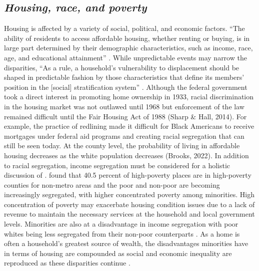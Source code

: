 \subsection{\textit{Housing, race, and poverty}}
Housing is affected by a variety of social, political, and economic factors. “The ability of residents to access affordable housing, whether renting or buying, is in large part determined by their demographic characteristics, such as income, race, age, and educational attainment” \citep[115]{yadavalli_comprehensive_2020}. While unpredictable events may narrow the disparities, “As a rule, a household’s vulnerability to displacement should be shaped in predictable fashion by those characteristics that define its members’ position in the [social] stratification system” \citep[5]{lee_forced_2020}. Although the federal government took a direct interest in promoting home ownership in 1933, racial discrimination in the housing market was not outlawed until 1968 but enforcement of the law remained difficult until the Fair Housing Act of 1988 (Sharp \& Hall, 2014). For example, the practice of redlining made it difficult for Black Americans to receive mortgages under federal aid programs and creating racial segregation that can still be seen today. At the county level, the probability of living in affordable housing decreases as the white population decreases (Brooks, 2022). In addition to racial segregation, income segregation must be considered for a holistic discussion of \hs. \citet{lichter_rural_2011} found that 40.5 percent of high-poverty places are in high-poverty counties for non-metro areas and the poor and non-poor are becoming increasingly segregated, with higher concentrated poverty among minorities. High concentration of poverty may exacerbate housing condition issues due to a lack of revenue to maintain the necessary services at the household and local government levels. Minorities are also at a disadvantage in income segregation with poor whites being less segregated from their non-poor counterparts \citep{lichter_ruralurban_2021}. As a home is often a household's greatest source of wealth, the disadvantages minorities have in terms of housing are compounded as social and economic inequality are reproduced as these disparities continue \citep{krivo_housing_2004}.  


